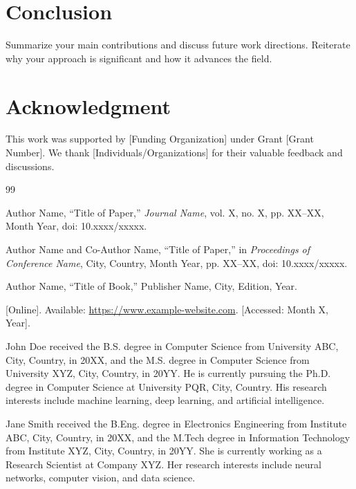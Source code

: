 \documentclass[conference]{IEEEtran}
\begin{document}
\section{Conclusion}
\label{sec:conclusion}

Summarize your main contributions and discuss future work directions. Reiterate why your approach is significant and how it advances the field.

\section*{Acknowledgment}
This work was supported by [Funding Organization] under Grant [Grant Number]. We thank [Individuals/Organizations] for their valuable feedback and discussions.

\begin{thebibliography}{99}

 Author Name, ``Title of Paper,'' \textit{Journal Name}, vol. X, no. X, pp. XX--XX, Month Year, doi: 10.xxxx/xxxxx.

 Author Name and Co-Author Name, ``Title of Paper,'' in \textit{Proceedings of Conference Name}, City, Country, Month Year, pp. XX--XX, doi: 10.xxxx/xxxxx.

 Author Name, ``Title of Book,'' Publisher Name, City, Edition, Year.

 [Online]. Available: \url{https://www.example-website.com}. [Accessed: Month X, Year].

\end{thebibliography}

\begin{IEEEbiography}{John Doe}
received the B.S. degree in Computer Science from University ABC, City, Country, in 20XX, and the M.S. degree in Computer Science from University XYZ, City, Country, in 20YY. He is currently pursuing the Ph.D. degree in Computer Science at University PQR, City, Country. His research interests include machine learning, deep learning, and artificial intelligence.
\end{IEEEbiography}

\begin{IEEEbiography}{Jane Smith}
received the B.Eng. degree in Electronics Engineering from Institute ABC, City, Country, in 20XX, and the M.Tech degree in Information Technology from Institute XYZ, City, Country, in 20YY. She is currently working as a Research Scientist at Company XYZ. Her research interests include neural networks, computer vision, and data science.
\end{IEEEbiography}
\end{document}
